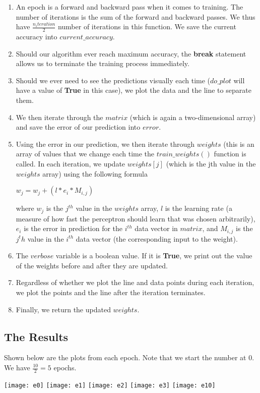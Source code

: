 	\begin{enumerate}
		\item An epoch is a forward and backward pass when it comes to training. The number of iterations is the sum of the forward and backward passes. We thus have $\frac{n_iteration }{2}$ number of iterations in this function. We save the current accuracy into $current\_accuracy$. 
		
		\item Should our algorithm ever reach maximum accuracy, the \textbf{break} statement allows us to terminate the training process immediately. 
		
		\item Should we ever need to see the predictions visually each time ($do\_plot$ will have a value of \textbf{True} in this case), we plot the data and the line to separate them. 
		
		\item We then iterate through the $matrix$ (which is again a two-dimensional array) and save the error of our prediction into $error$.
		
		\item Using the error in our prediction, we then iterate through $weights$ (this is an array of values that we change each time the $train\_weights()$ function is called. In each iteration, we update $weights[j]$ (which is the jth value in the $weights$ array) using the following formula \\
		\begin{center}
			$w_j = w_j + (l * e_i * M_{i, j})$
		\end{center}
		
		where $w_j$ is the $j^{th}$ value in the $weights$ array, $l$ is the learning rate (a measure of how fast the perceptron should learn that was chosen arbitrarily), $e_i$ is the error in prediction for the $i^{th}$ data vector in $matrix$, and $M_{i, j}$ is the $j^th$ value in the $i^{th}$ data vector (the corresponding input to the weight).
		
		\item The $verbose$ variable is a boolean value. If it is \textbf{True}, we print out the value of the weights before and after they are updated. 
		
		\item Regardless of whether we plot the line and data points during each iteration, we plot the points and the line after the iteration terminates. 
		
		\item Finally, we return the updated $weights$.
	\end{enumerate}
	
\subsection{The Results}
Shown below are the plots from each epoch. Note that we start the number at $0$. We have $\frac{10}{2} = 5$ epochs.

\begin{center}
	\texttt{[image: e0]}
	\texttt{[image: e1]}
	\texttt{[image: e2]}
	\texttt{[image: e3]}
	\texttt{[image: e10]}
\end{center}